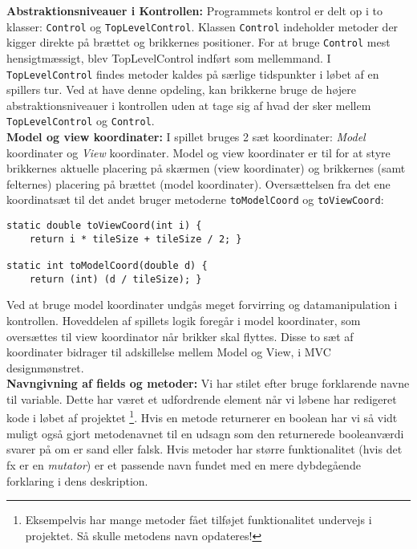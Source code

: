 \textbf{Abstraktionsniveauer i Kontrollen:} 
Programmets kontrol er delt op i to klasser: \texttt{Control} og \texttt{TopLevelControl}. Klassen \texttt{Control} indeholder metoder der kigger direkte på brættet og brikkernes positioner. For at bruge \texttt{Control} mest hensigtmæssigt, blev TopLevelControl indført som mellemmand. I \texttt{TopLevelControl} findes metoder kaldes på særlige tidspunkter i løbet af en spillers tur. Ved at have denne opdeling, kan brikkerne bruge de højere abstraktionsniveauer i kontrollen uden at tage sig af hvad der sker mellem \texttt{TopLevelControl} og \texttt{Control}. 
\\

\textbf{Model og view koordinater:} 
I spillet bruges 2 sæt koordinater: \textit{Model} koordinater og \textit{View} koordinater. Model og view koordinater er til for at styre brikkernes aktuelle placering på skærmen (view koordinater) og brikkernes (samt felternes) placering på brættet (model koordinater). Oversættelsen fra det ene koordinatsæt til det andet bruger metoderne \texttt{toModelCoord} og \texttt{toViewCoord}: 

\begin{lstlisting}
static double toViewCoord(int i) {
	return i * tileSize + tileSize / 2; }

static int toModelCoord(double d) {
	return (int) (d / tileSize); }
\end{lstlisting}

Ved at bruge model koordinater undgås meget forvirring og datamanipulation i kontrollen. Hoveddelen af spillets logik foregår i model koordinater, som oversættes til view koordinator når brikker skal flyttes. Disse to sæt af koordinater bidrager til adskillelse mellem Model og View, i MVC designmønstret. \\


\textbf{Navngivning af fields og metoder:} 
Vi har stilet efter bruge forklarende navne til variable. Dette har været et udfordrende element når vi løbene har redigeret kode i løbet af projektet \footnote{Eksempelvis har mange metoder fået tilføjet funktionalitet undervejs i projektet. Så skulle metodens navn opdateres!}. Hvis en metode returnerer en boolean har vi så vidt muligt også gjort metodenavnet til en udsagn som den returnerede booleanværdi svarer på om er sand eller falsk. Hvis metoder har større funktionalitet (hvis det fx er en \textit{mutator}) er et passende navn fundet med en mere dybdegående forklaring i dens deskription. \\

